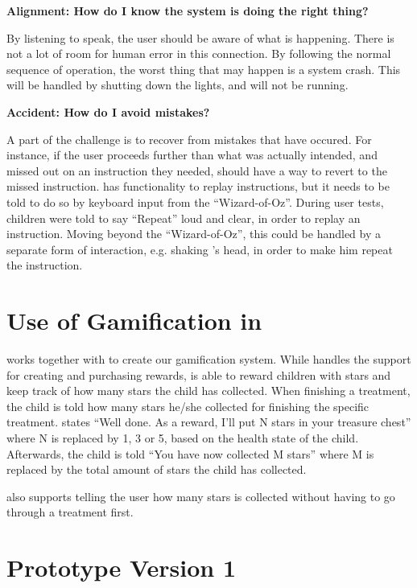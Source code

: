 \textbf{Alignment: How do I know the system is doing the right thing?}

By listening to \buddy{} speak, the user should be aware of what is happening. There is not a lot of room for human error in this connection. By following the normal sequence of operation, the worst thing that may happen is a system crash. This will be handled by shutting down the lights, and \buddy{} will not be running.  

\textbf{Accident: How do I avoid mistakes?}

A part of the challenge is to recover from mistakes that have occured. For instance, if the user proceeds further than what was actually intended, and missed out on an instruction they needed, \buddy{} should have a way to revert to the missed instruction. \ab{} has functionality to replay instructions, but it needs to be told to do so by keyboard input from the ``Wizard-of-Oz''. During user tests, children were told to say ``Repeat'' loud and clear, in order to replay an instruction. Moving beyond the ``Wizard-of-Oz'', this could be handled by a separate form of interaction, e.g. shaking \ab{}'s head, in order to make him repeat the instruction.      
\section{Use of Gamification in \ab{}}
\label{sec:useofgamificationinab}
\ab{} works together with \app{} to create our gamification system. While \app{} handles the support for creating and purchasing rewards, \ab{} is able to reward children with stars and keep track of how many stars the child has collected. 
When finishing a treatment, the child is told how many stars he/she collected for finishing the specific treatment. \ab{} states ``Well done. As a reward, I'll put N stars in your treasure chest'' where N is replaced by  1, 3 or 5, based on the health state of the child. Afterwards, the child is told ``You have now collected M stars'' where M is replaced by the total amount of stars the child has collected. 

\ab{} also supports telling the user how many stars is collected without having to go through a treatment first.



 

\section{Prototype Version 1}
\label{sec:proto1}

